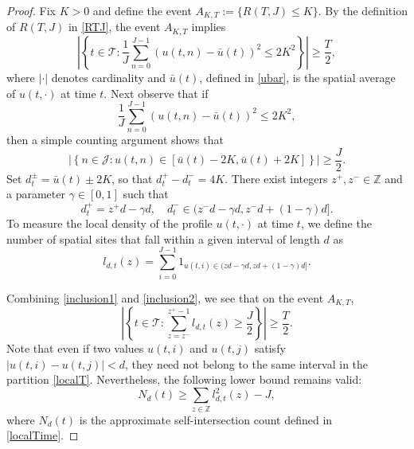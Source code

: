 \documentclass[12pt]{amsart}
\numberwithin{equation}{section}
\newcommand{\Z}{\mathbb{Z}}
\newcommand{\1}{\mathbf{1}}
\begin{document}
\begin{proof}
Fix $K>0$ and define the event $A_{K,T}:=\{R(T,J)\leq K\}$. By the definition of $R(T,J)$ in \eqref{RTJ}, the event $A_{K,T}$ implies
\begin{equation}
\label{inclusion1}
    \left\vert \left\lbrace t\in \mathcal{T}:\frac{1}{J}\sum_{n=0}^{J-1}(u(t,n)-\bar{u}(t))^2\leq2K^2\right\rbrace\right\vert\geq \frac{T}{2},
\end{equation}
where $|\cdot|$ denotes cardinality and $\bar u(t)$, defined in \eqref{ubar}, is the spatial average of $u(t,\cdot)$ at time $t$. Next observe that if
\begin{equation*}
    \frac{1}{J}\sum_{n=0}^{J-1}(u(t,n)-\bar{u}(t))^2\leq2K^2,
\end{equation*}
then a simple counting argument shows that
\begin{equation}
    \label{inclusion2}
    \left\vert \left\lbrace n\in \mathcal{J}:u(t,n)\in[\bar{u}(t)-2K,\bar{u}(t)+2K]\right\rbrace\right\vert\geq \frac{J}{2}.
\end{equation}
Set $d_t^{\pm}=\bar{u}(t)\pm 2K$, so that $d_t^+-d_t^-=4K$. There exist integers $z^+,z^-\in\mathbb{Z}$ and a parameter $\gamma\in[0,1]$ such that
\begin{equation*}
    d_t^+=z^+d-\gamma d, \quad d_t^-\in(z^-d-\gamma d,z^-d+(1-\gamma)d].
\end{equation*}
To measure the local density of the profile $u(t,\cdot)$ at time $t$, we define the number of spatial sites that fall within a given interval of length $d$ as
\begin{equation}
\label{localT}
    l_{d,t}(z)=\sum_{i=0}^{J-1}1_{u(t,i)\in(zd-\gamma d,zd+(1-\gamma)d]}.
\end{equation}

Combining \eqref{inclusion1} and \eqref{inclusion2}, we see that on the event $A_{K,T}$,
\begin{equation}
\label{localbound}
    \left\vert \left\lbrace t\in \mathcal{T}:\sum_{z=z^-}^{z^+-1}l_{d,t}(z)\geq \frac{J}{2}\right\rbrace\right\vert\geq \frac{T}{2}.
\end{equation}
Note that even if two values $u(t,i)$ and $u(t,j)$ satisfy $\vert u(t,i)-u(t,j)\vert<d$, they need not belong to the same interval in the partition \eqref{localT}. Nevertheless, the following lower bound remains valid:
\begin{equation}
\label{localTineq}
    N_d(t)\geq\sum_{z\in\Z}l^2_{d,t}(z)-J,
\end{equation}
where $N_d(t)$ is the approximate self-intersection count defined in \eqref{localTime}.


\end{proof}
\end{document}
